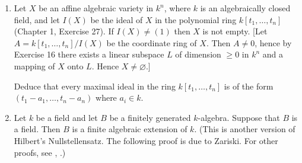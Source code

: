\begin{enumerate}
We shall assume that $k$ is infinite. (The result is still true if $k$ is finite, but a different proof is needed.) Let $x_1,\ldots,x_n$ generate $A$ as a $k$-algebra. We can renumber the $x_i$ so that $x_1,\ldots,x_r$ are algebraically independent over $k$ and each of $x_{r+1},\ldots,x_n$ is algebraic over $k[x_1,\ldots,x_r]$. Now proceed by induction on $n$. If $n=r$ there is nothing to do, so suppose $n>r$ and the result true for $n-1$ generators. The generator $x_n$ is algebraic over $k[x_1,\ldots,x_{n-1}]$, hence there exists a polynomial $f\neq0$ in $n$ variables such that $f(x_1,\ldots,x_{n-1},x_n)=0$. Let $F$ be the homogeneous part of highest degree in $f$. Since $k$ is infinite, there exist $\lambda_1,\ldots,\lambda_{n-1}\in k$ such that $F(\lambda_1,\ldots,\lambda_{n-1},1)\neq0$. Put $x_i'=x_i-\lambda_ix_n$ $(1\leq i\leq n-1)$. Show that $x_n$ is integral over the ring $A'=k[x_1',\ldots,x_{n-1}']$, and hence that $A$ is integral over $A'$. Then apply the inductive hypothesis to $A'$ to complete the proof.

From the proof it follows that $y_1,\ldots,y_r$ may be chosen to be linear combinations of $x_1,\ldots,x_n$. This has the following geometrical interpretation: if $k$ is algebraically closed and $X$ is an affine algebraic variety in $k^n$ with coordinate ring $A\neq0$, then there exists a linear subspace $L$ of dimension $r$ in $k^n$ and a linear mapping of $k^n$ onto $L$ which maps $X$ onto $L$. [Use Exercise 2.]

\noindent\textit{Nullstellensatz} (weak form).

\item Let $X$ be an affine algebraic variety in $k^n$, where $k$ is an algebraically closed field, and let $I(X)$ be the ideal of $X$ in the polynomial ring $k[t_1,\ldots,t_n]$ (Chapter 1, Exercise 27). If $I(X)\neq(1)$ then $X$ is not empty. [Let $A=k[t_1,\ldots,t_n]/I(X)$ be the coordinate ring of $X$. Then $A\neq0$, hence by Exercise 16 there exists a linear subspace $L$ of dimension $\geq0$ in $k^n$ and a mapping of $X$ onto $L$. Hence $X\neq\varnothing$.]

Deduce that every maximal ideal in the ring $k[t_1,\ldots,t_n]$ is of the form $(t_1-a_1,\ldots,t_n-a_n)$ where $a_i\in k$.

\item Let $k$ be a field and let $B$ be a finitely generated $k$-algebra. Suppose that $B$ is a field. Then $B$ is a finite algebraic extension of $k$. (This is another version of Hilbert's Nullstellensatz. The following proof is due to Zariski. For other proofs, see , .)


\end{enumerate}
